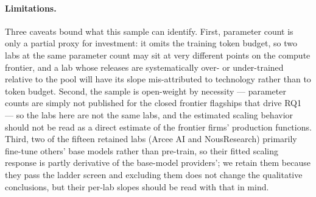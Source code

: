 \paragraph{Limitations.} Three caveats bound what this sample can identify.
First, parameter count is only a partial proxy for investment: it omits the
training token budget, so two labs at the same parameter count may sit at very
different points on the compute frontier, and a lab whose releases are
systematically over- or under-trained relative to the pool will have its slope
mis-attributed to technology rather than to token budget. Second, the sample is
open-weight by necessity --- parameter counts are simply not published for the
closed frontier flagships that drive RQ1 --- so the labs here are not the same
labs, and the estimated scaling behavior should not be read as a direct estimate
of the frontier firms' production functions. Third, two of the fifteen retained
labs (Arcee AI and NousResearch) primarily fine-tune others' base models rather
than pre-train, so their fitted scaling response is partly derivative of the
base-model providers'; we retain them because they pass the ladder screen and
excluding them does not change the qualitative conclusions, but their per-lab
slopes should be read with that in mind.
